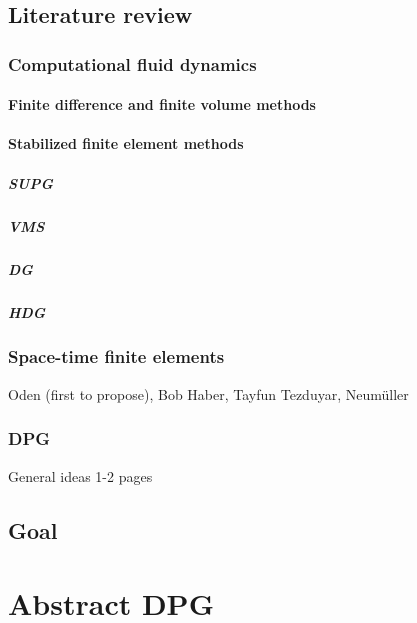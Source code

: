 \documentclass[12pt]{report}
\begin{document}
\section{Literature review}

\subsection{Computational fluid dynamics}

\subsubsection{Finite difference and finite volume methods}

\subsubsection{Stabilized finite element methods}
\paragraph{SUPG}
\paragraph{VMS}
\paragraph{DG}
\paragraph{HDG}

\subsection{Space-time finite elements}
Oden (first to propose), Bob Haber, Tayfun Tezduyar, Neum\"{u}ller
\cite{Klaij2006}
\cite{Rhebergen2013}
\cite{Haber2006}

\subsection{DPG}
General ideas 1-2 pages


\section{Goal}



\chapter{Abstract DPG}
\end{document}
